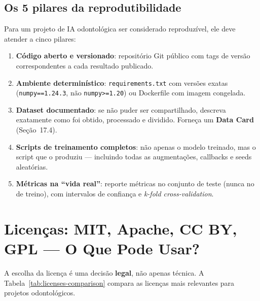  

\subsection{Os 5 pilares da reprodutibilidade}

Para um projeto de IA odontológica ser considerado reproduzível, ele
deve atender a cinco pilares:

\begin{enumerate}
  \item \textbf{Código aberto e versionado}: repositório Git público com
    tags de versão correspondentes a cada resultado publicado.

  \item \textbf{Ambiente determinístico}: \texttt{requirements.txt} com
    versões exatas (\texttt{numpy==1.24.3}, não \texttt{numpy>=1.20}) ou
    Dockerfile com imagem congelada.

  \item \textbf{Dataset documentado}: se não puder ser compartilhado,
    descreva exatamente como foi obtido, processado e dividido. Forneça
    um \textbf{Data Card} (Seção~17.4).

  \item \textbf{Scripts de treinamento completos}: não apenas o modelo
    treinado, mas o script que o produziu — incluindo todas as
    augmentações, callbacks e seeds aleatórias.

  \item \textbf{Métricas na ``vida real''}: reporte métricas no conjunto
    de teste (nunca no de treino), com intervalos de confiança e
    \textit{k-fold cross-validation}.
\end{enumerate}


\section{Licenças: MIT, Apache, CC BY, GPL — O Que Pode Usar?}

A escolha da licença é uma decisão \textbf{legal}, não apenas técnica.
A Tabela~\ref{tab:licenses-comparison} compara as licenças mais relevantes
para projetos odontológicos.

